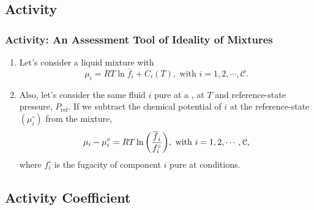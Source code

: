 \documentclass[10pt,compress,handout,ignorenonframetext,unknownkeysallowed]{beamer}
\begin{document}
\subsection{Activity}
\begin{frame}
  \frametitle{Activity: An Assessment Tool of Ideality of Mixtures}
        \begin{enumerate}%
           \item<1-> Let's consider a liquid mixture with
               \begin{displaymath}
                  \mu_{i} = RT\ln{\overline{f}_{i}} + C_{i}(T), \text{ with } i=1, 2, \cdots, \mathcal{C}.
               \end{displaymath}
           \item<2-> Also, let's consider the same fluid $i$ pure at a , \ie at $T$ and reference-state pressure, $P_{\text{ref}}$. If we subtract the chemical potential of $i$ at the reference-state $\left(\mu_{i}^{\circ}\right)$ from the mixture,
               \begin{displaymath}
                  \mu_{i} - \mu_{i}^{\circ} = RT\ln{\left(\displaystyle\frac{\overline{f}_{i}}{f_{i}^{\circ}}\right)} , \text{ with } i=1, 2, \cdots, \mathcal{C},
               \end{displaymath}
               where $f_{i}^{\circ}$ is the fugacity of component $i$ pure at  conditions.
           
               
        \end{enumerate}
\end{frame}
\normalsize


\subsection{Activity Coefficient}
\end{document}
